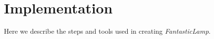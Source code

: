 \documentclass{bioinfo}
\theoremstyle{definition}
\begin{document}

\section*{Implementation}
\label{sec:implementation}
Here we describe the steps and tools used in creating \textit{FantasticLamp}. 
\end{document}
